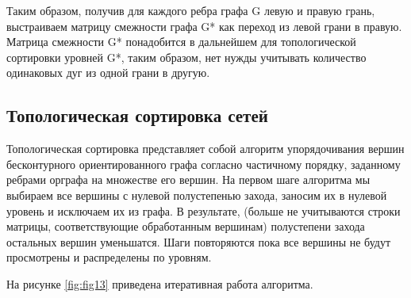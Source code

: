 Таким образом, получив для каждого ребра графа G левую и правую грань, выстраиваем матрицу смежности графа G* как переход из левой грани в правую. Матрица смежности G* понадобится в дальнейшем для топологической сортировки уровней G*, таким образом, нет нужды учитывать количество одинаковых дуг из одной грани в другую.

\subsection{Топологическая сортировка сетей}

Топологическая сортировка представляет собой алгоритм упорядочивания вершин бесконтурного ориентированного графа согласно частичному порядку, заданному ребрами орграфа на множестве его вершин. На первом шаге алгоритма мы выбираем все вершины с нулевой полустепенью захода, заносим их в нулевой уровень и исключаем их из графа. В результате, (больше не учитываются строки матрицы, соответствующие обработанным вершинам) полустепени захода остальных вершин уменьшатся. Шаги повторяются пока все вершины не будут просмотрены и распределены по уровням.

На рисунке \ref{fig:fig13} приведена итеративная работа алгоритма.

